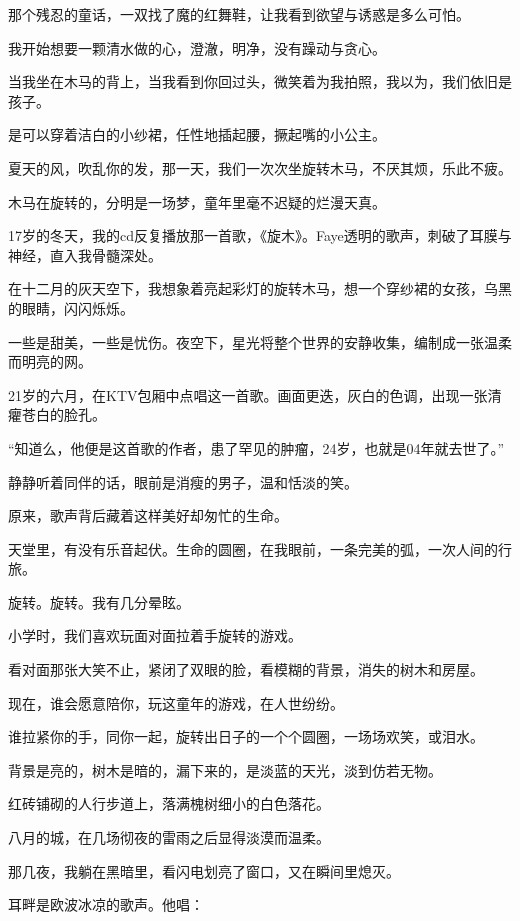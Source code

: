 		\vspace{1em}
		那个残忍的童话，一双找了魔的红舞鞋，让我看到欲望与诱惑是多么可怕。\par
		我开始想要一颗清水做的心，澄澈，明净，没有躁动与贪心。\par
		当我坐在木马的背上，当我看到你回过头，微笑着为我拍照，我以为，我们依旧是孩子。\par
		是可以穿着洁白的小纱裙，任性地插起腰，撅起嘴的小公主。\par
		夏天的风，吹乱你的发，那一天，我们一次次坐旋转木马，不厌其烦，乐此不疲。\par
		木马在旋转的，分明是一场梦，童年里毫不迟疑的烂漫天真。\par
		17岁的冬天，我的cd反复播放那一首歌，《旋木》。Faye透明的歌声，刺破了耳膜与神经，直入我骨髓深处。\par
		在十二月的灰天空下，我想象着亮起彩灯的旋转木马，想一个穿纱裙的女孩，乌黑的眼睛，闪闪烁烁。\par
		一些是甜美，一些是忧伤。夜空下，星光将整个世界的安静收集，编制成一张温柔而明亮的网。\par
		21岁的六月，在KTV包厢中点唱这一首歌。画面更迭，灰白的色调，出现一张清癯苍白的脸孔。\par
		“知道么，他便是这首歌的作者，患了罕见的肿瘤，24岁，也就是04年就去世了。”\par
		静静听着同伴的话，眼前是消瘦的男子，温和恬淡的笑。\par
		原来，歌声背后藏着这样美好却匆忙的生命。\par
		天堂里，有没有乐音起伏。生命的圆圈，在我眼前，一条完美的弧，一次人间的行旅。\par
		旋转。旋转。我有几分晕眩。\par
		小学时，我们喜欢玩面对面拉着手旋转的游戏。\par
		看对面那张大笑不止，紧闭了双眼的脸，看模糊的背景，消失的树木和房屋。\par
		现在，谁会愿意陪你，玩这童年的游戏，在人世纷纷。\par
		谁拉紧你的手，同你一起，旋转出日子的一个个圆圈，一场场欢笑，或泪水。



		背景是亮的，树木是暗的，漏下来的，是淡蓝的天光，淡到仿若无物。\par
		红砖铺砌的人行步道上，落满槐树细小的白色落花。\par
		八月的城，在几场彻夜的雷雨之后显得淡漠而温柔。\par
		那几夜，我躺在黑暗里，看闪电划亮了窗口，又在瞬间里熄灭。\par
		耳畔是欧波冰凉的歌声。他唱：

